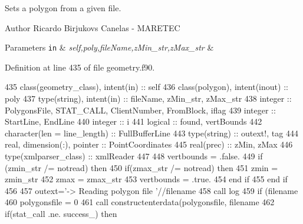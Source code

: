 Sets a polygon from a given file. 

\begin{DoxyAuthor}{Author}
Ricardo Birjukovs Canelas -\/ M\+A\+R\+E\+T\+EC 
\end{DoxyAuthor}

\begin{DoxyParams}[1]{Parameters}
\mbox{\tt in}  & {\em self,poly,file\+Name,z\+Min\+\_\+str,z\+Max\+\_\+str} & \\
\hline
\end{DoxyParams}


Definition at line 435 of file geometry.\+f90.


\begin{DoxyCode}
435     \textcolor{keywordtype}{class}(geometry\_class), \textcolor{keywordtype}{intent(in)} :: self
436     \textcolor{keywordtype}{class}(polygon), \textcolor{keywordtype}{intent(inout)} :: poly
437     \textcolor{keywordtype}{type}(string), \textcolor{keywordtype}{intent(in)} :: fileName, zMin\_str, zMax\_str
438     \textcolor{keywordtype}{integer} :: PolygonsFile, STAT\_CALL, ClientNumber, FromBlock, iflag
439     \textcolor{keywordtype}{integer} :: StartLine, EndLine
440     \textcolor{keywordtype}{integer} :: i
441     \textcolor{keywordtype}{logical} :: found, vertBounds
442     \textcolor{keywordtype}{character(len = line\_length)} :: FullBufferLine
443     \textcolor{keywordtype}{type}(string) :: outext\textcolor{comment}{!, tag}
444     \textcolor{keywordtype}{real}, \textcolor{keywordtype}{dimension(:)}, \textcolor{keywordtype}{pointer} :: PointCoordinates
445     \textcolor{keywordtype}{real(prec)} :: zMin, zMax
446     \textcolor{keywordtype}{type}(xmlparser\_class) :: xmlReader
447 
448     vertbounds = .false.
449     \textcolor{keywordflow}{if} (zmin\_str /= notread) \textcolor{keywordflow}{then}
450         \textcolor{keywordflow}{if}(zmax\_str /= notread) \textcolor{keywordflow}{then}
451             zmin = zmin\_str%
452             zmax = zmax\_str%
453             vertbounds = .true.
454 \textcolor{keywordflow}{        end if}
455 \textcolor{keywordflow}{    end if}
456     
457     outext=\textcolor{stringliteral}{'-> Reading polygon file '}//filename
458     \textcolor{keyword}{call }log%
459     \textcolor{keywordflow}{if} (filename%
460         polygonsfile = 0
461         \textcolor{keyword}{call }constructenterdata(polygonsfile, filename%
462         \textcolor{keywordflow}{if}(stat\_call .ne. success\_) \textcolor{keywordflow}{then}

\end{DoxyCode}
